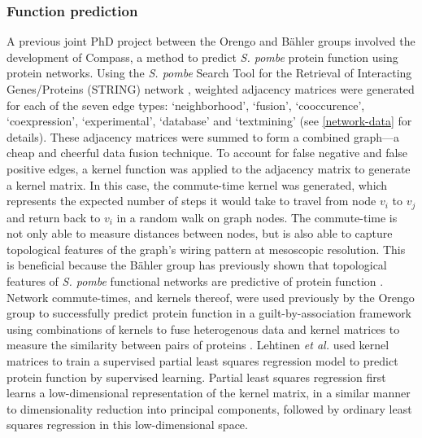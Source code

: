 \subsubsection{Function prediction}

A previous joint PhD project between the Orengo and Bähler groups involved the development of Compass, a method to predict \emph{S. pombe} protein function using protein networks. Using the \emph{S. pombe} Search Tool for the Retrieval of Interacting Genes/Proteins (STRING) network \cite{Szklarczyk2015}, weighted adjacency matrices were generated for each of the seven edge types: `neighborhood', `fusion', `cooccurence', `coexpression', `experimental', `database' and `textmining' (see \ref{network-data} for details). These adjacency matrices were summed to form a combined graph---a cheap and cheerful data fusion technique. To account for false negative and false positive edges, a kernel function was applied to the adjacency matrix to generate a kernel matrix. In this case, the commute-time kernel \cite{Fouss2012} was generated, which represents the expected number of steps it would take to travel from node $v_i$ to $v_j$ and return back to $v_i$ in a random walk on graph nodes. The commute-time is not only able to measure distances between nodes, but is also able to capture topological features of the graph's wiring pattern at mesoscopic resolution. This is beneficial because the Bähler group has previously shown that topological features of \emph{S. pombe} functional networks are predictive of protein function \cite{Sarac2012,Pancaldi2012}. Network commute-times, and kernels thereof, were used previously by the Orengo group to successfully predict protein function in a guilt-by-association framework using combinations of kernels to fuse heterogenous data and kernel matrices to measure the similarity between pairs of proteins \cite{Lees2015,Heriche2014}. Lehtinen \emph{et al.} \cite{Lehtinen2015} used kernel matrices to train a supervised partial least squares regression model \cite{Cristianini2004} to predict protein function by supervised learning. Partial least squares regression first learns a low-dimensional representation of the kernel matrix, in a similar manner to dimensionality reduction into principal components, followed by ordinary least squares regression in this low-dimensional space.

